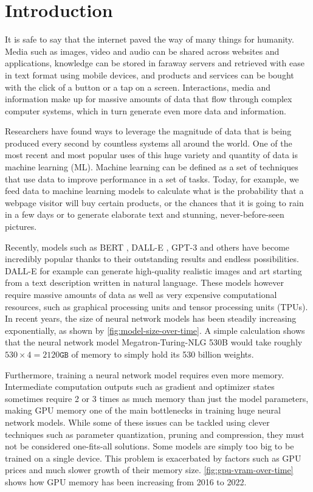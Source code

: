 
\chapter{Introduction}\label{chapter:introduction}

It is safe to say that the internet paved the way of many things for humanity.
Media such as images, video and audio can be shared across websites and applications, knowledge can be stored in faraway servers and retrieved with ease in text format using mobile devices, and products and services can be bought with the click of a button or a tap on a screen.
Interactions, media and information make up for massive amounts of data that flow through complex computer systems, which in turn generate even more data and information.

Researchers have found ways to leverage the magnitude of data that is being produced every second by countless systems all around the world.
One of the most recent and most popular uses of this huge variety and quantity of data is machine learning (ML).
Machine learning can be defined as a set of techniques that use data to improve performance in a set of tasks.
Today, for example, we feed data to machine learning models to calculate what is the probability that a webpage visitor will buy certain products, or the chances that it is going to rain in a few days or to generate elaborate text and stunning, never-before-seen pictures.

Recently, models such as BERT \cite{devlin2018bert}, DALL-E \cite{ramesh2021zero}, GPT-3 \cite{brown2020gpt3} and others have become incredibly popular thanks to their outstanding results and endless possibilities.
DALL-E for example can generate high-quality realistic images and art starting from a text description written in natural language.
These models however require massive amounts of data as well as very expensive computational resources, such as graphical processing units and tensor processing units (TPUs).
In recent years, the size of neural network models has been steadily increasing exponentially, as shown by \autoref{fig:model-size-over-time}.
A simple calculation shows that the neural network model Megatron-Turing-NLG 530B \cite{smith2022megatronturingnlg} would take roughly $530 \times 4 = 2120\texttt{GB}$ of memory to simply hold its 530 billion weights.

Furthermore, training a neural network model requires even more memory.
Intermediate computation outputs such as gradient and optimizer states sometimes require 2 or 3 times as much memory than just the model parameters, making GPU memory one of the main bottlenecks in training huge neural network models.
While some of these issues can be tackled using clever techniques such as parameter quantization, pruning and compression, they must not be considered one-fits-all solutions.
Some models are simply too big to be trained on a single device.
This problem is exacerbated by factors such as GPU prices and much slower growth of their memory size.
\autoref{fig:gpu-vram-over-time} shows how GPU memory has been increasing from 2016 to 2022.

